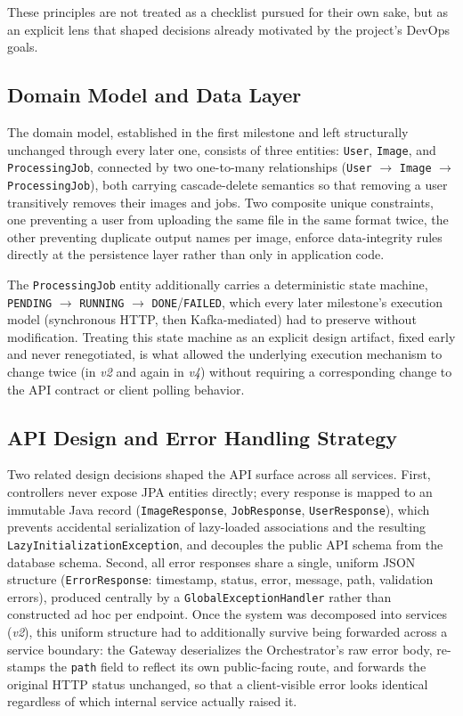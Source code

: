 \documentclass[twoside]{supsistudent}
\begin{document}
These principles are not treated as a checklist pursued for their own sake, but as an explicit lens that shaped decisions already motivated by the project's DevOps goals.

\subsection{Domain Model and Data Layer}
The domain model, established in the first milestone and left structurally unchanged through every later one, consists of three entities: \texttt{User}, \texttt{Image}, and \texttt{ProcessingJob}, connected by two one-to-many relationships (\texttt{User} $\rightarrow$ \texttt{Image} $\rightarrow$ \texttt{ProcessingJob}), both carrying cascade-delete semantics so that removing a user transitively removes their images and jobs. Two composite unique constraints, one preventing a user from uploading the same file in the same format twice, the other preventing duplicate output names per image, enforce data-integrity rules directly at the persistence layer rather than only in application code.

The \texttt{ProcessingJob} entity additionally carries a deterministic state machine, \texttt{PENDING} $\rightarrow$ \texttt{RUNNING} $\rightarrow$ \texttt{DONE}/\texttt{FAILED}, which every later milestone's execution model (synchronous HTTP, then Kafka-mediated) had to preserve without modification. Treating this state machine as an explicit design artifact, fixed early and never renegotiated, is what allowed the underlying execution mechanism to change twice (in \emph{v2} and again in \emph{v4}) without requiring a corresponding change to the API contract or client polling behavior.

\subsection{API Design and Error Handling Strategy}
Two related design decisions shaped the API surface across all services. First, controllers never expose JPA entities directly; every response is mapped to an immutable Java record (\texttt{ImageResponse}, \texttt{JobResponse}, \texttt{UserResponse}), which prevents accidental serialization of lazy-loaded associations and the resulting \texttt{LazyInitializationException}, and decouples the public API schema from the database schema. Second, all error responses share a single, uniform JSON structure (\texttt{ErrorResponse}: timestamp, status, error, message, path, validation errors), produced centrally by a \texttt{GlobalExceptionHandler} rather than constructed ad hoc per endpoint. Once the system was decomposed into services (\emph{v2}), this uniform structure had to additionally survive being forwarded across a service boundary: the Gateway deserializes the Orchestrator's raw error body, re-stamps the \texttt{path} field to reflect its own public-facing route, and forwards the original HTTP status unchanged, so that a client-visible error looks identical regardless of which internal service actually raised it.
\end{document}
